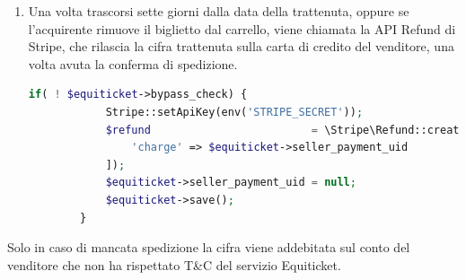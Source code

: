 \begin{enumerate}
\begin{lstlisting}[language=PHP, caption={Metodo \textit{checkout} per completare l'acquisto}]
			$order->updateBalance();

			$order->tickets->each(function (Ticket $ticket) use ($order) {
				for($i = 1; $i <= $ticket->pivot->quantity; $i ++) {
					$issue            = new TicketIssue();
					$issue->order_id  = $order->id;
					$issue->ticket_id = $ticket->id;
					$issue->unique_id = str_replace('.','',str_replace(' ','',microtime()));
					$issue->save();
				}
			});

			\Mail::to(env('MAIL_SYSTEM_TO'))->send(new ConfirmOrderToAdmin($order));
			\Mail::to($order->email)->send(new ConfirmOrderToUser($order));

			$order->equitickets->each(function (Equiticket $equiticket) use ($order) {
				\Mail::to($equiticket->user->seller->email)->send(new ConfirmEquiticketOrderToSeller($equiticket, $order));
			});
			$order->tickets->each(function (Ticket $ticket) use ($order) {
				\Mail::to($ticket->event->event_organizer->email)->send(new ConfirmTicketOrderToSeller($ticket, $order));
			});

			return view('cart.success');
		} catch(\Exception $ex) {
			return $ex->getMessage();
		}
	}
\end{lstlisting}
\item Una volta trascorsi sette giorni dalla data della trattenuta, oppure se l'acquirente rimuove il biglietto dal carrello, viene chiamata la API Refund di Stripe, che rilascia la cifra trattenuta sulla carta di credito del venditore, una volta avuta la conferma di spedizione.
\begin{lstlisting}[language=PHP, caption={Rilascio dei fondi sulla carta del venditore}]
if( ! $equiticket->bypass_check) {
			Stripe::setApiKey(env('STRIPE_SECRET'));
			$refund                         = \Stripe\Refund::create([
				'charge' => $equiticket->seller_payment_uid
			]);
			$equiticket->seller_payment_uid = null;
			$equiticket->save();
		}
\end{lstlisting}
\end{enumerate}
Solo in caso di mancata spedizione la cifra viene addebitata sul conto del venditore che non ha rispettato T\&C del servizio Equiticket.
